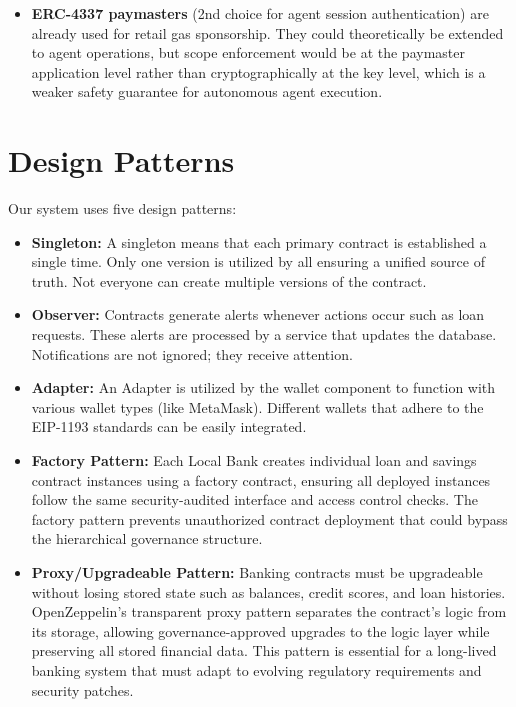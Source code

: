 \documentclass[12pt,a4paper]{report}
\begin{document}
\begin{itemize}[noitemsep]
\item \textbf{ERC-4337 paymasters} (2nd choice for agent session authentication) are already used for retail gas sponsorship. They could theoretically be extended to agent operations, but scope enforcement would be at the paymaster application level rather than cryptographically at the key level, which is a weaker safety guarantee for autonomous agent execution.
\end{itemize}


\section{Design Patterns}

Our system uses five design patterns:

\begin{itemize}[noitemsep]
\item \textbf{Singleton:} A singleton means that each primary contract is established a single time. Only one version is utilized by all ensuring a unified source of truth. Not everyone can create multiple versions of the contract.

\item \textbf{Observer:} Contracts generate alerts whenever actions occur such as loan requests. These alerts are processed by a service that updates the database. Notifications are not ignored; they receive attention.

\item \textbf{Adapter:} An Adapter is utilized by the wallet component to function with various wallet types (like MetaMask). Different wallets that adhere to the EIP-1193 standards can be easily integrated.

\item \textbf{Factory Pattern:} Each Local Bank creates individual loan and savings contract instances using a factory contract, ensuring all deployed instances follow the same security-audited interface and access control checks. The factory pattern prevents unauthorized contract deployment that could bypass the hierarchical governance structure.

\item \textbf{Proxy/Upgradeable Pattern:} Banking contracts must be upgradeable without losing stored state such as balances, credit scores, and loan histories. OpenZeppelin's transparent proxy pattern separates the contract's logic from its storage, allowing governance-approved upgrades to the logic layer while preserving all stored financial data. This pattern is essential for a long-lived banking system that must adapt to evolving regulatory requirements and security patches.


\end{itemize}
\end{document}
